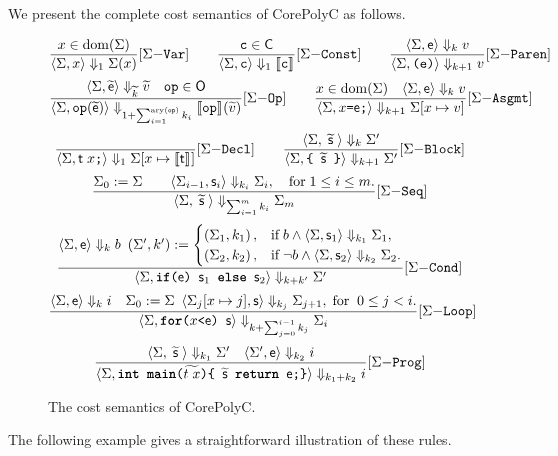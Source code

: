 \documentclass[runningheads]{llncs}
\begin{document}
We present the complete cost semantics of CorePolyC as follows.
\begin{figure}[t]
    \centering
    \[
\srule{x\in\dom(\Sigma)}{\cost{\Sigma}{x}{\Sigma(x)}{1}}{Var}\qquad
\srule{\c\in\C}{\cost{\Sigma}{\c}{\smap{\c}{}}{1}}{Const}\qquad
\srule{\cost{\Sigma}{\e}{v}{k}}{\cost{\Sigma}{\texttt{(e)}}{v}{k+1}}{Paren}\]
\[
\srule{\cost{\Sigma}{\widetilde{\e}}{\widetilde{v}}{\widetilde{k}}\quad \op\in\O}{\cost{\Sigma}{\op(\widetilde{\e})}{\smap{\op}{}(\widetilde{v})}{1+\sum_{i=1}^{\arity(\op)}k_i}}{Op}\qquad
\srule{x\in\dom(\Sigma)\quad \cost{\Sigma}{\e}{v}{k}}{\cost{\Sigma}{x\texttt{=}\e\texttt{;}}{\Sigma[x\mapsto{v}]}{k+1}}{Asgmt}
\]
\[
\srule{}{\cost{\Sigma}{\tt\;x\texttt{;}}{\Sigma[x\mapsto{\smap{\tt}{}}]}{1}}{Decl}\qquad
\srule{\cost{\Sigma}{\;\widetilde{\s}\;}{\Sigma'}{k}}{\cost{\Sigma}{\texttt{\{ }\widetilde{\s}\texttt{ \}}}{\Sigma'}{k+1}}{Block}
\]
\[
\srule{\Sigma_0:=\Sigma\qquad\cost{\Sigma_{i-1}}{\s_i}{\Sigma_{i}}{k_i} ,\quad\text{for}\;1\le i\le m.}{\cost{\Sigma}{\;\widetilde{\s}\;}{\Sigma_m}{\sum_{i=1}^{m}k_i}}{Seq}\]
\[
\srule{\cost{\Sigma}{\e}{b}{k}\enspace (\Sigma',k'):=\begin{cases}(\Sigma_1,k_1)\,,&\text{if}\;b\land \cost{\Sigma}{\s_1}{\Sigma_1}{k_1}, \\
(\Sigma_2,k_2)\,,&\text{if}\;\lnot b\land \cost{\Sigma}{\s_2}{\Sigma_2}{k_2}.\end{cases}
}
{\cost{\Sigma}{\texttt{\textbf{if}(}\e\texttt{) } \s_1 \texttt{ \textbf{else} } \s_2}{\Sigma'}{k+k'}}{Cond}
\]
\[
\srule{\cost{\Sigma}{\e}{i}{k}\quad\Sigma_0:=\Sigma\enspace\cost{\Sigma_{j}[x\mapsto j]}{\s}{\Sigma_{j+1}}{k_j},\;\text{for}\;\;0\le j< i.}{\cost{\Sigma}{\texttt{\textbf{for}(}x \texttt{<} \e \texttt{) } \s}{\Sigma_{i}}{k+\sum_{j=0}^{i-1}k_j}}{Loop}
\]\vspace{1mm}
\[
\srule{\cost{\Sigma}{\;\widetilde{\s}\;}{\Sigma'}{k_1}\quad\cost{\Sigma'}{\e}{i}{k_2}}{\cost{\Sigma}{\texttt{\textbf{int} \textbf{main}(}\widetilde{t\;x}\texttt{)\{ }\widetilde{\s}\texttt{ \textbf{return} }\e\texttt{;\}}}{i}{k_1+k_2}}{Prog}
\]
    \caption{The cost semantics of CorePolyC.}
    \label{fig:cost_semantics}
\end{figure}
The following example gives a straightforward illustration of these rules.
\end{document}
